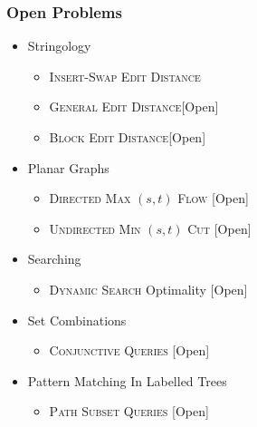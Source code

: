 \begin{frame}
\frametitle{Open Problems}
\begin{itemize}

\item Stringology
  \begin{itemize}
\item \textsc{Insert-Swap Edit Distance}\hfill {\tiny \cite{2015-SPIRE-AdaptiveComputationOfTheSwapInsertCorrectionDistance-BarbayPerez}}
\item \textsc{General Edit Distance}\hfill [\alert{Open}]
\item \textsc{Block Edit Distance}\hfill [\alert{Open}]
  \end{itemize}
\vfill
\item Planar Graphs
  \begin{itemize}
\item \textsc{Directed Max $(s,t)$ Flow} \hfill [\alert{Open}]
\item \textsc{Undirected Min $(s,t)$ Cut} \hfill [\alert{Open}]
  \end{itemize}
\item Searching
  \begin{itemize}
\item \textsc{Dynamic Search} Optimality \hfill [\alert{Open}]
  \end{itemize}
\item Set Combinations
  \begin{itemize}
\item \textsc{Conjunctive Queries} \hfill [\alert{Open}]
  \end{itemize}
\item Pattern Matching In Labelled Trees
  \begin{itemize}
\item \textsc{Path Subset Queries}  \hfill [\alert{Open}]
  \end{itemize}
\end{itemize}
\end{frame}


